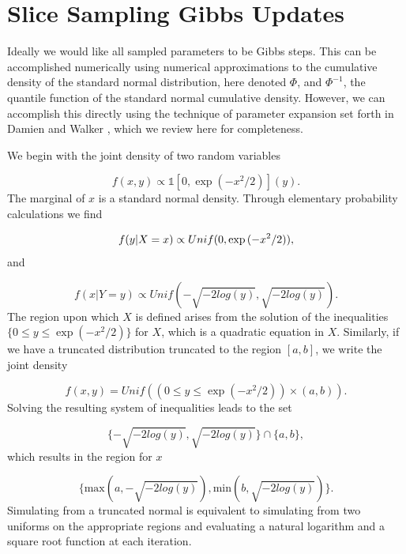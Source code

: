 \section{Slice Sampling Gibbs Updates}\label{sec:slice_gibbs}

Ideally we would like all sampled parameters to be Gibbs steps. This can be accomplished numerically using numerical approximations to the cumulative density of the standard normal distribution, here denoted $\Phi$, and $\Phi^{-1}$, the quantile function of the standard normal cumulative density.  However, we can accomplish this directly using the technique of parameter expansion set forth in Damien and Walker \cite{damien2001sampling}, which we review here for completeness. 
 
We begin with the joint density of two random variables 

\begin{equation}
f(x,y) \propto \mathds{1}[0, \exp{(-x^2/2)}](y).
\end{equation}
The marginal of $x$ is a standard normal density. Through elementary probability calculations we find 

\begin{equation}\newnot{symbol:unif}
f(y\vert X=x) \propto Unif(0, \exp{(-x^2/2)}),
\end{equation}
 and 
 
 \begin{equation}
f(x\vert Y=y) \propto Unif(-\sqrt{-2log(y)}, \sqrt{-2log(y)}).
\end{equation}
The region upon which $X$ is defined arises from the solution of the inequalities $\{0\leq y \leq \exp{(-x^2/2)} \} $ for $X$, which is a quadratic equation in $X$. Similarly, if we have a truncated distribution truncated to the region $[a,b]$, we write the joint density 
 
 \begin{equation}
 f(x,y)=Unif((0\leq y\leq \exp{(-x^2/2)})\times (a,b)).
 \end{equation}
 Solving the resulting system of inequalities leads to the set 
 
 \begin{equation}
 \{-\sqrt{-2log(y)}, \sqrt{-2log(y)} \} \cap \{a, b\},
 \end{equation}
which results in the region for $x$

\begin{equation}
 \{\text{max}(a,-\sqrt{-2log(y)}), \text{min}(b,\sqrt{-2log(y)} )\} .
 \end{equation}
 Simulating from a truncated normal is equivalent to simulating from two uniforms on the appropriate regions and evaluating a natural logarithm and a square root function at each iteration. 
 
